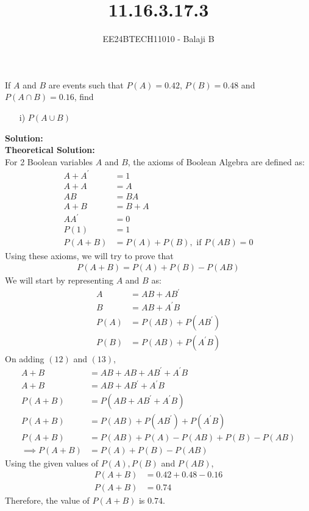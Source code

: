 \documentclass[journal]{IEEEtran}
\begin{document}

\vspace{3cm}

\title{11.16.3.17.3}
\author{EE24BTECH11010 - Balaji B }

{\let\newpage\relax\maketitle}

\renewcommand{\thefigure}{\theenumi}
\renewcommand{\thetable}{\theenumi}
\setlength{\intextsep}{10pt} %

\renewcommand{\thetable}{\theenumi}

If $A$ and $B$ are events such that $P(A)= 0.42$, $P(B)= 0.48$ and $P(A \cap B)= 0.16$, find 
\begin{itemize}
    \item [i)] $P(A \cup B)$
\end{itemize}
\textbf{Solution: }\\
\textbf{Theoretical Solution:\\}
For 2 Boolean variables $A$ and $B$, the axioms of Boolean Algebra are defined as:
\begin{align}
    A + A^\prime &= 1\\
    A + A &= A\\
    AB &= BA\\
    A + B &= B + A\\
    AA^\prime &= 0\\
    P(1) &= 1\\
    P(A + B) &= P(A) + P(B), \text{ if } P(AB) = 0
\end{align}
Using these axioms, we will try to prove that
\begin{align}
    P(A + B) = P(A) + P(B) - P(AB)
\end{align}
We will start by representing $A$ and $B$ as:
\begin{align}
    A &= AB + AB^\prime\\
    B &= AB + A^\prime B\\
    P(A) &= P(AB) + P(AB^\prime)\\
    P(B) &= P(AB) + P(A^\prime B)
\end{align}
On adding \((12)\) and \((13)\),
\begin{align}
A + B &= AB + AB + AB^\prime + A^\prime B\\
    A + B &= AB + AB^\prime + A^\prime B\\
    P(A + B) &= P(AB + AB^\prime + A^\prime B)\\
    P(A + B) &= P(AB) + P(AB^\prime) + P(A^\prime B)\\
    P(A + B) &= P(AB) + P(A) - P(AB) + P(B) - P(AB)\\
    \implies P(A + B) &= P(A) + P(B) - P(AB)
\end{align}
Using the given values of \(P(A), P(B)\) and \(P(AB)\),
\begin{align}
    P(A + B) &= 0.42 + 0.48 - 0.16\\
    P(A + B) &= 0.74
\end{align}
Therefore, the value of \(P(A + B)\) is \(0.74\). \\
\end{document}
